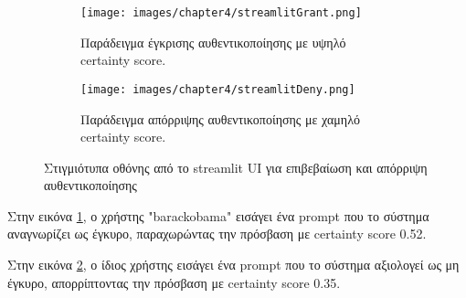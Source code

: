 \begin{figure}[H]
    \centering
    \begin{subfigure}{\textwidth}
        \centering
        \texttt{[image: images/chapter4/streamlitGrant.png]}
        \caption{Παράδειγμα έγκρισης αυθεντικοποίησης με υψηλό certainty score.}
        \label{fig:streamlitGrant}
    \end{subfigure}
    \hfill
    \begin{subfigure}{\textwidth}
        \centering
        \texttt{[image: images/chapter4/streamlitDeny.png]}
        \caption{Παράδειγμα απόρριψης αυθεντικοποίησης με χαμηλό certainty score.}
        \label{fig:streamlitDeny}
    \end{subfigure}
    \caption{Στιγμιότυπα οθόνης από το streamlit UI για επιβεβαίωση και απόρριψη αυθεντικοποίησης}
    \label{fig:subgraphs}
\end{figure}

Στην εικόνα \ref{fig:streamlitGrant}, ο χρήστης "barackobama" εισάγει ένα prompt που το σύστημα αναγνωρίζει ως έγκυρο, παραχωρώντας την πρόσβαση με certainty score 0.52.

Στην εικόνα \ref{fig:streamlitDeny}, ο ίδιος χρήστης εισάγει ένα prompt που το σύστημα αξιολογεί ως μη έγκυρο, απορρίπτοντας την πρόσβαση με certainty score 0.35.

